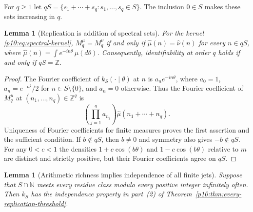 \documentclass[11pt,letterpaper]{article}
\newtheorem{lemma}[theorem]{Lemma}
\theoremstyle{definition}
\theoremstyle{remark}
\newcommand{\1}{\mathbf 1}
\begin{document}
For $q\ge1$ let
$qS=\{s_1+\cdots+s_q:s_1,\ldots,s_q\in S\}$.
The inclusion $0\in S$ makes these sets increasing in $q$.

\begin{lemma}[Replication is addition of spectral sets]
\label{p10:lem:replication-sumset}
For the kernel \eqref{p10:eq:spectral-kernel}, $M_q^\mu=M_q^\nu$ if and
only if $\widehat\mu(n)=\widehat\nu(n)$ for every $n\in qS$, where
$\widehat\mu(n)=\int e^{-in\theta}\,\mu(d\theta)$.
Consequently, identifiability at order $q$ holds if and only if
$qS=\mathbb Z$.
\end{lemma}

\begin{proof}
The Fourier coefficient of $k_S(\cdot\mid\theta)$ at $n$ is
$a_n e^{-in\theta}$, where $a_0=1$,
$a_n=e^{-n^2}/2$ for $n\in S\setminus\{0\}$, and $a_n=0$ otherwise.
Thus the Fourier coefficient of $M_q^\mu$ at
$(n_1,\ldots,n_q)\in\mathbb Z^q$ is
\[
 \left(\prod_{j=1}^q a_{n_j}\right)
 \widehat\mu(n_1+\cdots+n_q).
\]
Uniqueness of Fourier coefficients for finite measures proves the first
assertion and the sufficient condition.  If $b\notin qS$, then $b\ne0$
and symmetry also gives $-b\notin qS$.  For any $0<c<1$ the densities
$1+c\cos(b\theta)$ and $1-c\cos(b\theta)$ relative to $m$ are distinct
and strictly positive, but their Fourier coefficients agree on $qS$.
\end{proof}

\begin{lemma}[Arithmetic richness implies independence of all finite jets]
\label{p10:lem:AP-jets}
Suppose that $S\cap\mathbb N$ meets every residue class modulo every
positive integer infinitely often.  Then $k_S$ has the independence
property in part~\textup{(2)} of
Theorem~\ref{p10:thm:every-replication-threshold}.
\end{lemma}
\end{document}
